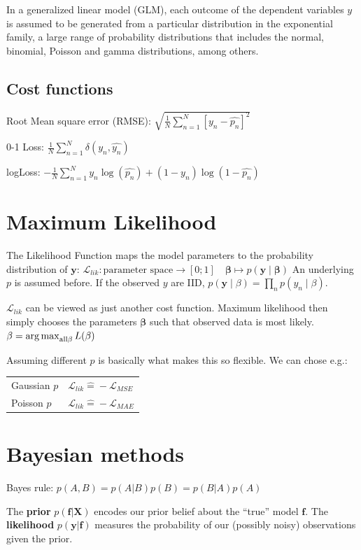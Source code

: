\documentclass[10pt,a4paper,landscape]{article}
\providecommand{\bf}[1]{\ensuremath{\mathbf{#1}}}
\begin{document}
\begin{multicols*}{4}
In a generalized linear model (GLM), each outcome of the dependent variables $y$ is assumed to be generated from a particular distribution in the exponential family, a large range of probability distributions that includes the normal, binomial, Poisson and gamma distributions, among others.


\subsection{Cost functions}
Root Mean square error (RMSE): $\sqrt{\frac{1}{N} \sum_{n=1}^{N}\left[y_n- \hat{p_n} \right]^2}$

0-1 Loss: $ \frac{1}{N} \sum_{n=1}^{N} \delta(y_n, \hat{y_n})$

logLoss: $- \frac{1}{N}  \sum_{n=1}^{N} y_n \log(\hat{p_n}) + (1-y_n) \log(1-\hat{p_n})$

\section{Maximum Likelihood}
The Likelihood Function maps the model parameters to the probability distribution of $\bf{y}$:
$\mathcal{L}_{lik}\colon \text{parameter space} \to [0;1]\quad  \bf{\beta} \mapsto p(\bf{y} \mid  \bf{\beta})$
An underlying $p$ is assumed before. If the observed $y$ are IID, $p(\bf{y} \mid \beta) = \prod_n p(y_n \mid \beta)$.

$\mathcal{L}_{lik}$ can be viewed as just another cost function. Maximum likelihood then simply chooses the parameters $\bf{\beta}$ such that observed data is most likely. $\beta = \operatorname*{arg\,max}_{\text{all} \beta} L(\beta)$

Assuming different $p$ is basically what makes this so flexible. We can chose e.g.:

\begin{tabular}{ l  l }
  \hline
  Gaussian $p$ & $\mathcal{L}_{lik} \widehat{=} -\mathcal{L}_{MSE}$ \\
  Poisson $p$  & $\mathcal{L}_{lik} \widehat{=} -\mathcal{L}_{MAE}$ \\
  \hline
\end{tabular}

\section{Bayesian methods}
Bayes rule: $p(A, B) = p(A|B) p(B) = p(B|A) p(A)$

The \textbf{prior} $p(\bf{f}|\bf{X})$ encodes our prior belief about the ``true'' model $\bf{f}$. The \textbf{likelihood} $p(\bf{y}|\bf{f})$ measures the probability of our (possibly noisy) observations given the prior.


\end{multicols*}
\end{document}
